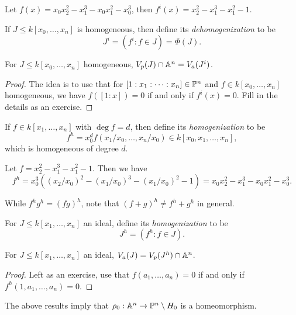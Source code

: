 \begin{example}
  Let $f(x) = x_0 x_2^2 - x_1^3 - x_0 x_1^2 - x_0^3$,
  then
  $f^i(x) = x_2^2 - x_1^3 - x_1^2 - 1$.
\end{example}

\begin{definition}
  If $J \le k[x_0, \dots, x_n]$
  is homogeneous, then define
  its \emph{dehomogenization} to be
  \[
    J^i = (f^i : f \in J)
    = \Phi(J).
  \]
\end{definition}

\begin{prop}
  For $J \le k[x_0, \dots, x_n]$
  homogeneous,
  $V_p(J) \cap \mathbb{A}^n = V_a(J^i)$.
\end{prop}

\begin{proof}
  The idea is to
  use that for
  $[1 : x_1 : \dots : x_n] \in \mathbb{P}^n$
  and $f \in k[x_0, \dots, x_n]$
  homogeneous, we have
  $f([1 : x]) = 0$ if and only if
  $f^i(x) = 0$. Fill in the details
  as an exercise.
\end{proof}

\begin{definition}
  If $f \in k[x_1, \dots, x_n]$
  with $\deg f  = d$, then define
  its \emph{homogenization} to be
  \[
    f^h = x_0^d f(x_1 / x_0, \dots, x_n / x_0) \in k[x_0, x_1, \dots, x_n],
  \]
  which is homogeneous of degree $d$.
\end{definition}

\begin{example}
  Let $f = x_2^2 - x_1^3 - x_1^2 - 1$.
  Then we have
  \[
    f^h = x_0^3 ((x_2 / x_0)^2 - (x_1 / x_0)^3 - (x_1 / x_0)^2 - 1)
    = x_0 x_2^2 - x_1^3 - x_0 x_1^2 - x_0^3.
  \]
\end{example}

\begin{remark}
  While $f^h g^h = (fg)^h$, note that
  $(f + g)^h \ne f^h + g^h$ in general.
\end{remark}

\begin{definition}
  For $J \le k[x_1, \dots, x_n]$ an ideal,
  define its \emph{homogenization} to be
  \[
    J^h = (f^h : f \in J).
  \]
\end{definition}

\begin{prop}
  For $J \le k[x_1, \dots, x_n]$ an ideal,
  $V_a(J) = V_p(J^h) \cap \mathbb{A}^n$.
\end{prop}

\begin{proof}
  Left as an exercise,
  use that
  $f(a_1, \dots, a_n) = 0$ if and only
  if $f^h(1, a_1, \dots, a_n) = 0$.
\end{proof}

\begin{remark}
  The above results imply that
  $\rho_0 : \mathbb{A}^n \to \mathbb{P}^n \setminus H_0$
  is a homeomorphism.
\end{remark}
